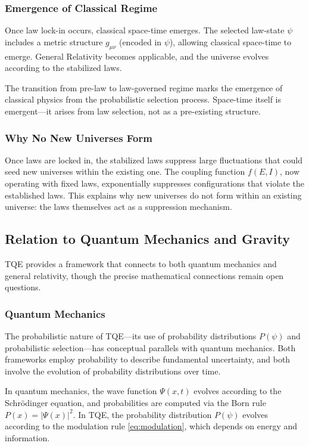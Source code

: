 \documentclass[12pt,a4paper]{article}
\theoremstyle{definition}
\theoremstyle{remark}
\begin{document}
\subsubsection{Emergence of Classical Regime}

Once law lock-in occurs, classical space-time emerges. The selected law-state $\psi$ includes a metric structure $g_{\mu\nu}$ (encoded in $\psi$), allowing classical space-time to emerge. General Relativity becomes applicable, and the universe evolves according to the stabilized laws.

The transition from pre-law to law-governed regime marks the emergence of classical physics from the probabilistic selection process. Space-time itself is emergent—it arises from law selection, not as a pre-existing structure.

\subsubsection{Why No New Universes Form}

Once laws are locked in, the stabilized laws suppress large fluctuations that could seed new universes within the existing one. The coupling function $f(E,I)$, now operating with fixed laws, exponentially suppresses configurations that violate the established laws. This explains why new universes do not form within an existing universe: the laws themselves act as a suppression mechanism.

\subsection{Relation to Quantum Mechanics and Gravity}

TQE provides a framework that connects to both quantum mechanics and general relativity, though the precise mathematical connections remain open questions.

\subsubsection{Quantum Mechanics}

The probabilistic nature of TQE—its use of probability distributions $P(\psi)$ and probabilistic selection—has conceptual parallels with quantum mechanics. Both frameworks employ probability to describe fundamental uncertainty, and both involve the evolution of probability distributions over time.

In quantum mechanics, the wave function $\Psi(x,t)$ evolves according to the Schrödinger equation, and probabilities are computed via the Born rule $P(x) = |\Psi(x)|^2$. In TQE, the probability distribution $P(\psi)$ evolves according to the modulation rule \eqref{eq:modulation}, which depends on energy and information.
\end{document}
